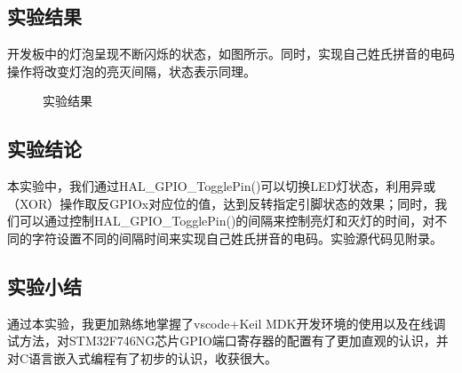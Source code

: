 ﻿\documentclass[UTF8,12pt]{article}
\begin{document}
\subsection{实验结果}

开发板中的灯泡呈现不断闪烁的状态，如图所示。同时，实现自己姓氏拼音的电码操作将改变灯泡的亮灭间隔，状态表示同理。

\begin{figure}[htbp]
    \centering
    \caption{实验结果}
\end{figure}


\newpage


\subsection{实验结论}
本实验中，我们通过HAL\_GPIO\_TogglePin()可以切换LED灯状态，利用异或（XOR）操作取反GPIOx对应位的值，达到反转指定引脚状态的效果；同时，我们可以通过控制HAL\_GPIO\_TogglePin()的间隔来控制亮灯和灭灯的时间，对不同的字符设置不同的间隔时间来实现自己姓氏拼音的电码。实验源代码见附录。

\subsection{实验小结}
通过本实验，我更加熟练地掌握了vscode+Keil MDK开发环境的使用以及在线调试方法，对STM32F746NG芯片GPIO端口寄存器的配置有了更加直观的认识，并对C语言嵌入式编程有了初步的认识，收获很大。
\end{document}
